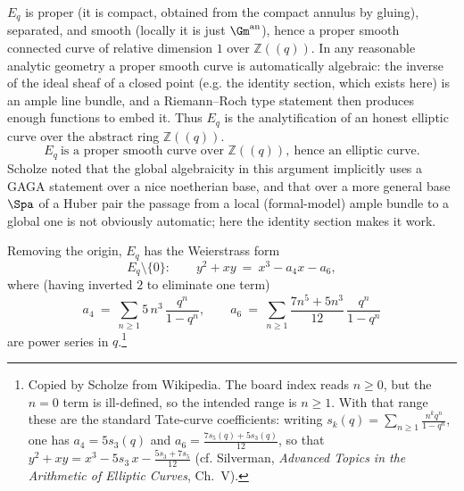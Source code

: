 \begin{center}
\end{center}

\begin{remark}[$E_q$ is algebraic]
\label{rmk:12:algebraic}
$E_q$ is proper (it is compact, obtained from the compact annulus by gluing),
separated, and smooth (locally it is just $\Gm^{\mathrm{an}}$), hence a proper
smooth connected curve of relative dimension $1$ over $\mathbb{Z}(\!(q)\!)$. In
any reasonable analytic geometry a proper smooth curve is automatically
algebraic: the inverse of the ideal sheaf of a closed point (e.g. the identity
section, which exists here) is an ample line bundle, and a Riemann--Roch type
statement then produces enough functions to embed it. Thus $E_q$ is the
analytification of an honest elliptic curve over the abstract ring
$\mathbb{Z}(\!(q)\!)$.
\begin{equation*}
E_q\ \text{is a proper smooth curve over } \mathbb{Z}(\!(q)\!),\ \text{hence an elliptic curve.}
\end{equation*}
Scholze noted that the global algebraicity in this argument implicitly uses a
GAGA statement over a nice noetherian base, and that over a more general base
$\Spa$ of a Huber pair the passage from a local (formal-model) ample bundle to a
global one is not obviously automatic; here the identity section makes it work.
\end{remark}

\begin{proposition}
\label{prop:12:weierstrass}
Removing the origin, $E_q$ has the Weierstrass form
\begin{equation*}
E_q\setminus\{0\}:\qquad y^{2}+xy\ =\ x^{3}-a_{4}x-a_{6},
\end{equation*}
where (having inverted $2$ to eliminate one term)
\begin{equation*}
a_{4}\ =\ \sum_{n\ge 1} 5\,n^{3}\,\frac{q^{n}}{1-q^{n}},
\qquad
a_{6}\ =\ \sum_{n\ge 1}\frac{7n^{5}+5n^{3}}{12}\,\frac{q^{n}}{1-q^{n}}
\end{equation*}
are power series in $q$.\footnote{Copied by Scholze from Wikipedia. The board
index reads $n\ge 0$, but the $n=0$ term is ill-defined, so the intended range
is $n\ge 1$. With that range these are the standard Tate-curve coefficients:
writing $s_k(q)=\sum_{n\ge1}\tfrac{n^k q^n}{1-q^n}$, one has $a_4=5s_3(q)$ and
$a_6=\tfrac{7s_5(q)+5s_3(q)}{12}$, so that
$y^2+xy=x^3-5s_3\,x-\tfrac{5s_3+7s_5}{12}$ (cf. Silverman, \emph{Advanced Topics
in the Arithmetic of Elliptic Curves}, Ch.~V).}
\end{proposition}

